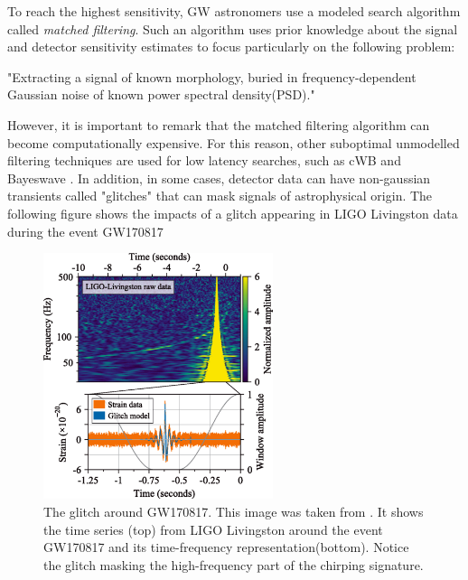 To reach the highest sensitivity, GW astronomers use a modeled search algorithm called \textit{matched filtering}. Such an algorithm uses prior knowledge about the signal and detector sensitivity estimates to focus particularly on the following problem:

"Extracting a signal of known morphology, buried in frequency-dependent Gaussian noise of known power spectral density(PSD)."

However, it is important to remark that the matched filtering algorithm can become computationally expensive. For this reason, other suboptimal unmodelled filtering techniques are used for low latency searches, such as cWB and Bayeswave \cite{Drago:2020kic, Cornish:2014kda}. In addition, in some cases, detector data can have non-gaussian transients called "glitches" that can mask signals of astrophysical origin. The following figure shows the impacts of a glitch appearing in LIGO Livingston data during the event GW170817
 

\begin{figure}[hbt!]
\begin{center}
\includegraphics[width=0.6\textwidth, angle=0]{images/170817.png}
\captionsetup{width=0.8\textwidth}
\caption[The glitch around GW170817]{The glitch around GW170817. This image was taken from \cite{LIGOScientific:2017vwq}. It shows the time series (top) from LIGO Livingston around the event GW170817 and its time-frequency representation(bottom). Notice the glitch masking the high-frequency part of the chirping signature.}
\label{ijenfo}
\end{center}
\end{figure}

\FloatBarrier

